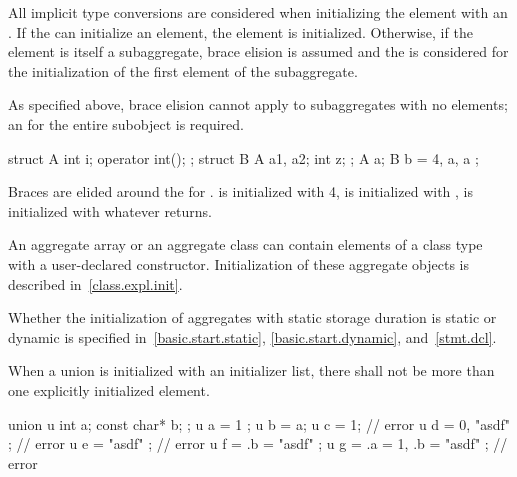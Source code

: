 \pnum
All implicit type conversions are considered when
initializing the element with an .
If the
can initialize an element, the element is initialized.
Otherwise, if the element is itself a subaggregate,
brace elision is assumed and the
is considered for the initialization of the first element of the subaggregate.
\begin{note}
As specified above, brace elision cannot apply to
subaggregates with no elements; an
 for the entire subobject is
required.
\end{note}

\begin{example}
\begin{codeblock}
struct A {
  int i;
  operator int();
};
struct B {
  A a1, a2;
  int z;
};
A a;
B b = { 4, a, a };
\end{codeblock}

Braces are elided around the
for
.
is initialized with 4,
is initialized with
,
is initialized with whatever
returns.
\end{example}

\pnum
{}%
\begin{note}
An aggregate array or an aggregate class can contain elements of a
class type with a user-declared constructor.
Initialization of these aggregate objects is described in~\ref{class.expl.init}.
\end{note}

\pnum
\begin{note}
Whether the initialization of aggregates with static storage duration
is static or dynamic is specified
in~\ref{basic.start.static}, \ref{basic.start.dynamic}, and~\ref{stmt.dcl}.
\end{note}

\pnum
{}%
When a union is initialized with an initializer list,
there shall not be more than one
explicitly initialized element.
\begin{example}
\begin{codeblock}
union u { int a; const char* b; };
u a = { 1 };
u b = a;
u c = 1;                        // error
u d = { 0, "asdf" };            // error
u e = { "asdf" };               // error
u f = { .b = "asdf" };
u g = { .a = 1, .b = "asdf" };  // error
\end{codeblock}
\end{example}

